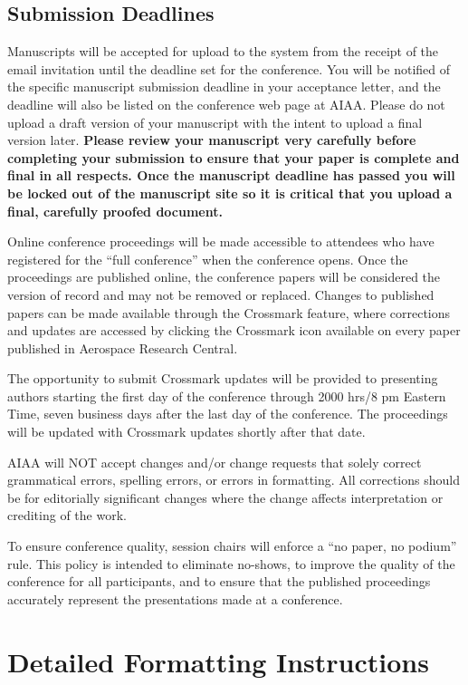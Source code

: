 \documentclass[conf]{new-aiaa}
\begin{document}
\subsection{Submission Deadlines}

Manuscripts will be accepted for upload to the system from the receipt of the email invitation until the deadline set for the conference. You will be notified of the specific manuscript submission deadline in your acceptance letter, and the deadline will also be listed on the conference web page at AIAA. Please do not upload a draft version of your manuscript with the intent to upload a final version later. \textbf{Please review your manuscript very carefully before completing your submission to ensure that your paper is complete and final in all respects. Once the manuscript deadline has passed you will be locked out of the manuscript site so it is critical that you upload a final, carefully proofed document.}

Online conference proceedings will be made accessible to attendees who have registered for the ``full conference'' when the conference opens. Once the proceedings are published online, the conference papers will be considered the version of record and may not be removed or replaced. Changes to published papers can be made available through the Crossmark feature, where corrections and updates are accessed by clicking the Crossmark icon available on every paper published in Aerospace Research Central.

The opportunity to submit Crossmark updates will be provided to presenting authors starting the first day of the conference through 2000 hrs/8 pm Eastern Time, seven business days after the last day of the conference.  The proceedings will be updated with Crossmark updates shortly after that date.  

AIAA will NOT accept changes and/or change requests that solely correct grammatical errors, spelling errors, or errors in formatting.  All corrections should be for editorially significant changes where the change affects interpretation or crediting of the work.

To ensure conference quality, session chairs will enforce a ``no paper, no podium'' rule. This policy is intended to eliminate no-shows, to improve the quality of the conference for all participants, and to ensure that the published proceedings accurately represent the presentations made at a conference.

\section{Detailed Formatting Instructions}
\end{document}
